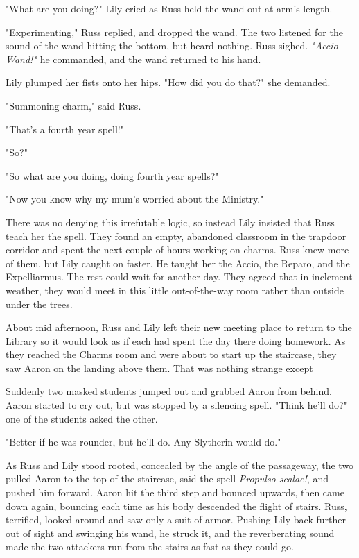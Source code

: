 "What are you doing?" Lily cried as Russ held the wand out at arm's length.

"Experimenting," Russ replied, and dropped the wand. The two listened for the sound of the wand hitting the bottom, but heard nothing. Russ sighed. \emph{"Accio Wand!"} he commanded, and the wand returned to his hand.

Lily plumped her fists onto her hips. "How did you do that?" she demanded.

"Summoning charm," said Russ.

"That's a fourth year spell!"

"So?"

"So what are you doing, doing fourth year spells?"

"Now you know why my mum's worried about the Ministry."

There was no denying this irrefutable logic, so instead Lily insisted that Russ teach her the spell. They found an empty, abandoned classroom in the trapdoor corridor and spent the next couple of hours working on charms. Russ knew more of them, but Lily caught on faster. He taught her the Accio, the Reparo, and the Expelliarmus. The rest could wait for another day. They agreed that in inclement weather, they would meet in this little out-of-the-way room rather than outside under the trees.

About mid afternoon, Russ and Lily left their new meeting place to return to the Library so it would look as if each had spent the day there doing homework. As they reached the Charms room and were about to start up the staircase, they saw Aaron on the landing above them. That was nothing strange except{\el}

Suddenly two masked students jumped out and grabbed Aaron from behind. Aaron started to cry out, but was stopped by a silencing spell. "Think he'll do?" one of the students asked the other.

"Better if he was rounder, but he'll do. Any Slytherin would do."

As Russ and Lily stood rooted, concealed by the angle of the passageway, the two pulled Aaron to the top of the staircase, said the spell \emph{Propulso scalae!}, and pushed him forward. Aaron hit the third step and bounced upwards, then came down again, bouncing each time as his body descended the flight of stairs. Russ, terrified, looked around and saw only a suit of armor. Pushing Lily back further out of sight and swinging his wand, he struck it, and the reverberating sound made the two attackers run from the stairs as fast as they could go.

